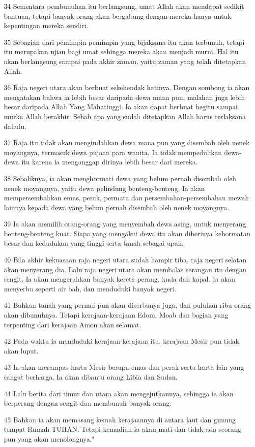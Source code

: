 \par 34 Sementara pembunuhan itu berlangsung, umat Allah akan mendapat sedikit bantuan, tetapi banyak orang akan bergabung dengan mereka hanya untuk kepentingan mereka sendiri.
\par 35 Sebagian dari pemimpin-pemimpin yang bijaksana itu akan terbunuh, tetapi itu merupakan ujian bagi umat sehingga mereka akan menjadi murni. Hal itu akan berlangsung sampai pada akhir zaman, yaitu zaman yang telah ditetapkan Allah.
\par 36 Raja negeri utara akan berbuat sekehendak hatinya. Dengan sombong ia akan mengatakan bahwa ia lebih besar daripada dewa mana pun, malahan juga lebih besar daripada Allah Yang Mahatinggi. Ia akan dapat berbuat begitu sampai murka Allah berakhir. Sebab apa yang sudah ditetapkan Allah harus terlaksana dahulu.
\par 37 Raja itu tidak akan mengindahkan dewa mana pun yang disembah oleh nenek moyangnya, termasuk dewa pujaan para wanita. Ia tidak mempedulikan dewa-dewa itu karena ia menganggap dirinya lebih besar dari mereka.
\par 38 Sebaliknya, ia akan menghormati dewa yang belum pernah disembah oleh nenek moyangnya, yaitu dewa pelindung benteng-benteng. Ia akan mempersembahkan emas, perak, permata dan persembahan-persembahan mewah lainnya kepada dewa yang belum pernah disembah oleh nenek moyangnya.
\par 39 Ia akan memilih orang-orang yang menyembah dewa asing, untuk menyerang benteng-benteng kuat. Siapa yang mengakui dewa itu akan diberinya kehormatan besar dan kedudukan yang tinggi serta tanah sebagai upah.
\par 40 Bila akhir kekuasaan raja negeri utara sudah hampir tiba, raja negeri selatan akan menyerang dia. Lalu raja negeri utara akan membalas serangan itu dengan sengit. Ia akan mengerahkan banyak kereta perang, kuda dan kapal. Ia akan menyerbu seperti air bah, dan menduduki banyak negeri.
\par 41 Bahkan tanah yang permai pun akan diserbunya juga, dan puluhan ribu orang akan dibunuhnya. Tetapi kerajaan-kerajaan Edom, Moab dan bagian yang terpenting dari kerajaan Amon akan selamat.
\par 42 Pada waktu ia menduduki kerajaan-kerajaan itu, kerajaan Mesir pun tidak akan luput.
\par 43 Ia akan merampas harta Mesir berupa emas dan perak serta harta lain yang sangat berharga. Ia akan dibantu orang Libia dan Sudan.
\par 44 Lalu berita dari timur dan utara akan mengejutkannya, sehingga ia akan berperang dengan sengit dan membunuh banyak orang.
\par 45 Bahkan ia akan memasang kemah kerajaannya di antara laut dan gunung tempat Rumah TUHAN. Tetapi kemudian ia akan mati dan tidak ada seorang pun yang akan menolongnya."

